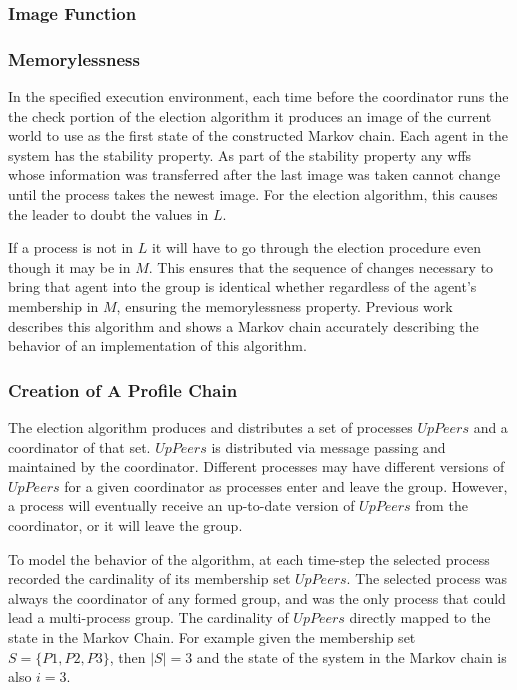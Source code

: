 \subsubsection{Image Function}

\subsubsection{Memorylessness}

In the specified execution environment, each time before the coordinator runs the the check portion of the election algorithm it produces an image of the current world to use as the first state of the constructed Markov chain. Each agent in the system has the stability property. As part of the stability property any wffs whose information was transferred after the last image was taken cannot change until the process takes the newest image. For the election algorithm, this causes the leader to doubt the values in $L$.

If a process is not in $L$ it will have to go through the election procedure even though it may be in $M$. This ensures that the sequence of changes necessary to bring that agent into the group is identical whether regardless of the agent's membership in $M$, ensuring the memorylessness property. Previous work \cite{JOURNAL} describes this algorithm and shows a Markov chain accurately describing the behavior of an implementation of this algorithm.

\subsubsection{Creation of A Profile Chain}

The election algorithm produces and distributes a set of processes $UpPeers$ and a coordinator of that set.
$UpPeers$ is distributed via message passing and maintained by the coordinator.
Different processes may have different versions of $UpPeers$ for a given coordinator as processes enter and leave the group.
However, a process will eventually receive an up-to-date version of $UpPeers$ from the coordinator, or it will leave the group.

To model the behavior of the algorithm, at each time-step the selected process recorded the cardinality of its membership set $UpPeers$.
The selected process was always the coordinator of any formed group, and was the only process that could lead a multi-process group.
The cardinality of $UpPeers$ directly mapped to the state in the Markov Chain.
For example given the membership set $S=\{P1,P2,P3\}$, then $\left | S \right |=3$ and the state of the system in the Markov chain is also $i=3$.

